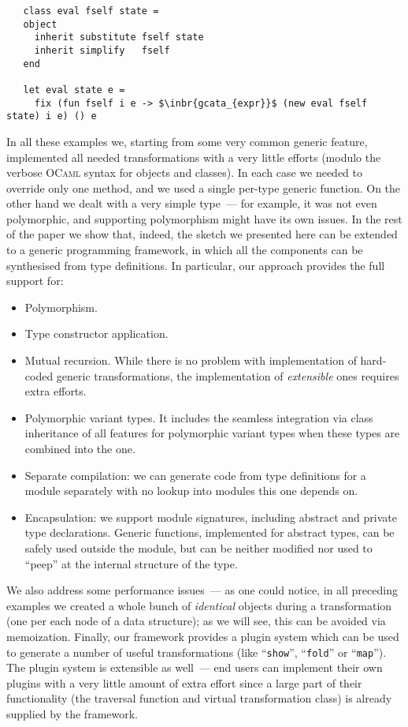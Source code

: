 \begin{lstlisting}
   class eval fself state =
   object
     inherit substitute fself state
     inherit simplify   fself
   end

   let eval state e =
     fix (fun fself i e -> $\inbr{gcata_{expr}}$ (new eval fself state) i e) () e  
\end{lstlisting}

In all these examples we, starting from some very common generic feature, implemented all needed transformations with a very little efforts (modulo
the verbose \textsc{OCaml} syntax for objects and classes). In each case we needed to override only one method, and we used a single per-type generic
function. On the other hand we dealt with a very simple type~--- for example, it was not even polymorphic, and supporting polymorphism might have
its own issues. In the rest of the paper we show that, indeed, the sketch we presented here can be extended to a generic programming
framework, in which all the components can be synthesised from type definitions. In particular, our approach provides the full support for:

\begin{itemize}
\item Polymorphism.
\item Type constructor application.
\item Mutual recursion. While there is no problem with implementation of hard-coded generic transformations, the implementation of \emph{extensible} ones
  requires extra efforts.
\item Polymorphic variant types. It includes the seamless integration via class inheritance of all features
  for polymorphic variant types when these types are combined into the one.
\item Separate compilation: we can generate code from type definitions for a module separately with no lookup into
  modules this one depends on.
\item Encapsulation: we support module signatures, including abstract and private type declarations. Generic functions, implemented for
  abstract types, can be safely used outside the module, but can be neither modified nor used to ``peep'' at the internal structure of
  the type.  
\end{itemize}

We also address some performance issues~--- as one could notice, in all preceding examples we created a whole bunch of \emph{identical} objects during a
transformation (one per each node of a data structure); as we will see, this can be avoided via memoization. Finally, our framework provides a plugin system which can be
used to generate a number of useful transformations (like ``\lstinline{show}'', ``\lstinline{fold}'' or ``\lstinline{map}''). The plugin system is
extensible as well~--- end users can implement their own plugins with a very little amount of extra effort since a large part of their functionality (the traversal
function and virtual transformation class) is already supplied by the framework. 
